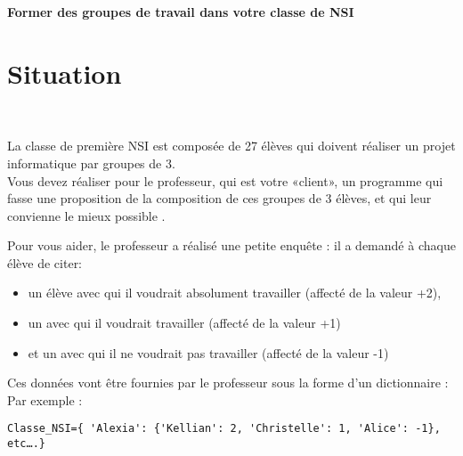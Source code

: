 \documentclass[12pt]{article}
\begin{document}
\setlength\parindent{0mm}
\renewcommand{\headrulewidth}{0pt}%


\cfoot{}
\rfoot{\thepage/\pageref{LastPage}} %
\renewcommand \footrulewidth{.2pt}

\pagestyle{fancy}
\thispagestyle{empty}

\begin{center} %

\Huge \textbf{ Former des groupes de travail dans votre classe de NSI}
\end{center}

\vspace{1cm}

\section{Situation}\

La classe de première NSI est composée de 27 élèves qui doivent réaliser un projet informatique par groupes de 3.\\
Vous devez réaliser pour le professeur, qui est votre «client», un programme qui fasse une proposition de la composition de ces groupes de 3 élèves, et qui leur convienne le mieux possible .

\medskip

Pour vous aider, le professeur a réalisé une petite enquête : il a demandé à chaque élève de citer:
\begin{itemize}
 \item [\textbullet] un élève avec qui il voudrait absolument travailler (affecté de la valeur +2),
 \item [\textbullet]un avec qui il voudrait travailler (affecté de la valeur +1)
 \item [\textbullet]et un avec qui il ne voudrait pas travailler (affecté de la valeur -1)
\end{itemize}

Ces données vont être fournies par le professeur sous la forme d’un dictionnaire :  
Par exemple : 
\begin{verbatim}
Classe_NSI={ 'Alexia': {'Kellian': 2, 'Christelle': 1, 'Alice': -1}, etc….}  
\end{verbatim}
\end{document}
